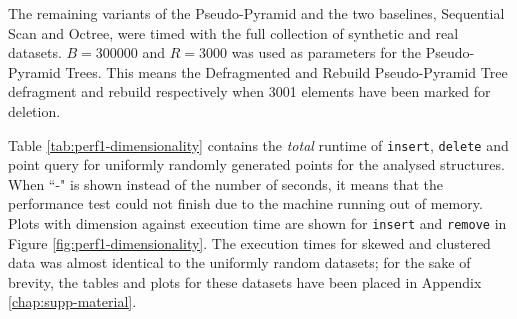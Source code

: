 The remaining variants of the Pseudo-Pyramid and the two baselines, Sequential Scan and Octree, were timed with the full collection of synthetic and real datasets. $B = 300000$ and $R=3000$ was used as parameters for the Pseudo-Pyramid Trees. This means the Defragmented and Rebuild Pseudo-Pyramid Tree defragment and rebuild respectively when 3001 elements have been marked for deletion.

Table \ref{tab:perf1-dimensionality} contains the \textit{total} runtime of \texttt{insert}, \texttt{delete} and point query for uniformly randomly generated points for the analysed structures. When ``-" is shown instead of the number of seconds, it means that the performance test could not finish due to the machine running out of memory. Plots with dimension against execution time are shown for \texttt{insert} and \texttt{remove} in Figure \ref{fig:perf1-dimensionality}. The execution times for skewed and clustered data was almost identical to the uniformly random datasets; for the sake of brevity, the tables and plots for these datasets have been placed in Appendix \ref{chap:supp-material}.

